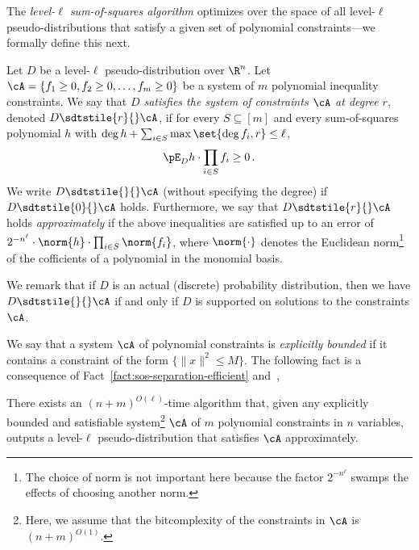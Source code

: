 The \emph{level-$\ell$ sum-of-squares algorithm} optimizes over the space of all level-$\ell$ pseudo-distributions that satisfy a given set of polynomial constraints---we formally define this next.

\begin{definition}
  Let $D$ be a level-$\ell$ pseudo-distribution over $\R^n$.
  Let $\cA = \{f_1\ge 0, f_2\ge 0, \ldots, f_m\ge 0\}$ be a system of $m$ polynomial inequality constraints.
  We say that \emph{$D$ satisfies the system of constraints $\cA$ at
    degree $r$}, denoted $D \sdtstile{r}{} \cA$, if for every
  $S\subseteq[m]$ and every sum-of-squares polynomial $h$ with $\deg h
  + \sum_{i\in S} \max\set{\deg f_i,r} \leq \ell$,
  \begin{displaymath}
    \pE_{D} h \cdot \prod _{i\in S}f_i  \ge 0\,.
  \end{displaymath}
  We write $D \sdtstile{}{} \cA$ (without specifying the degree) if $D \sdtstile{0}{} \cA$ holds.
  Furthermore, we say that $D\sdtstile{r}{}\cA$ holds \emph{approximately} if the above inequalities are satisfied up to an error of $2^{-n^\ell}\cdot \norm{h}\cdot\prod_{i\in S}\norm{f_i}$, where $\norm{\cdot}$ denotes the Euclidean norm\footnote{The choice of norm is not important here because the factor $2^{-n^\ell}$ swamps the effects of choosing another norm.} of the cofficients of a polynomial in the monomial basis.
\end{definition}

We remark that if $D$ is an actual (discrete) probability distribution, then we have  $D\sdtstile{}{}\cA$ if and only if $D$ is supported on solutions to the constraints $\cA$.

We say that a system $\cA$ of polynomial constraints is \emph{explicitly bounded} if it contains a constraint of the form $\{ \|x\|^2 \leq M\}$.
The following fact is a consequence of Fact~\ref{fact:sos-separation-efficient} and~\citet{MR625550-Grotschel81},

\begin{fact}
There exists an $(n+ m)^{O(\ell)} $-time algorithm that, given any explicitly bounded and satisfiable system\footnote{Here, we assume that the bitcomplexity of the constraints in $\cA$ is $(n+m)^{O(1)}$.} $\cA$ of $m$ polynomial constraints in $n$ variables, outputs a level-$\ell$ pseudo-distribution that satisfies $\cA$ approximately. 
\end{fact}


